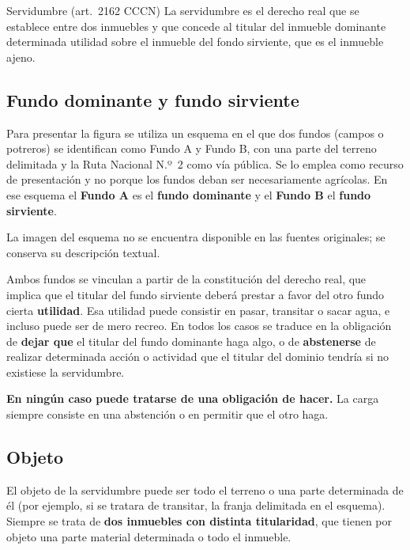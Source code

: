 \documentclass[12pt,oneside]{book}
\begin{document}
\begin{definition}{Servidumbre (art.~2162 CCCN)}
La servidumbre es el derecho real que se establece entre dos inmuebles y que concede al titular del inmueble dominante determinada utilidad sobre el inmueble del fondo sirviente, que es el inmueble ajeno.
\end{definition}

\subsection{Fundo dominante y fundo sirviente}

Para presentar la figura se utiliza un esquema en el que dos fundos (campos o potreros) se identifican como Fundo A y Fundo B, con una parte del terreno delimitada y la Ruta Nacional N.º~2 como vía pública. Se lo emplea como recurso de presentación y no porque los fundos deban ser necesariamente agrícolas. En ese esquema el \textbf{Fundo A} es el \textbf{fundo dominante} y el \textbf{Fundo B} el \textbf{fundo sirviente}.

\begin{note}
La imagen del esquema no se encuentra disponible en las fuentes originales; se conserva su descripción textual.
\end{note}

Ambos fundos se vinculan a partir de la constitución del derecho real, que implica que el titular del fundo sirviente deberá prestar a favor del otro fundo cierta \textbf{utilidad}. Esa utilidad puede consistir en pasar, transitar o sacar agua, e incluso puede ser de mero recreo. En todos los casos se traduce en la obligación de \textbf{dejar que} el titular del fundo dominante haga algo, o de \textbf{abstenerse} de realizar determinada acción o actividad que el titular del dominio tendría si no existiese la servidumbre.

\begin{important}
\textbf{En ningún caso puede tratarse de una obligación de hacer.} La carga siempre consiste en una abstención o en permitir que el otro haga.
\end{important}

\subsection{Objeto}

El objeto de la servidumbre puede ser todo el terreno o una parte determinada de él (por ejemplo, si se tratara de transitar, la franja delimitada en el esquema). Siempre se trata de \textbf{dos inmuebles con distinta titularidad}, que tienen por objeto una parte material determinada o todo el inmueble.
\end{document}
